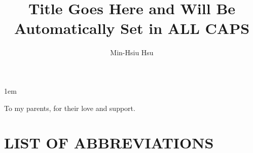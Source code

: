 \documentclass[draftthesis,tocnosub,noragright,centerchapter,12pt]{uiucecethesis09}
\title{Title Goes Here and Will Be Automatically Set in ALL CAPS}
\author{Min-Hsiu Hsu}
\begin{document}
%

%
\maketitle

\parindent 1em%

\frontmatter

%
\begin{abstract}

\end{abstract}


%
\begin{dedication}
To my parents, for their love and support.
\end{dedication}

%
\begin{acknowledgments}

\end{acknowledgments}

%
\tableofcontents

%
\listoftables

%
\listoffigures

%
\chapter{LIST OF ABBREVIATIONS}
\end{document}

